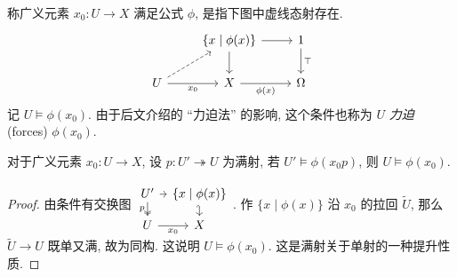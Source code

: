 \newcommand{\forces}{\models}

\begin{definition}
	{}
	称广义元素 $x_0 \colon U\to X$ 满足公式 $\phi$, 是指下图中虚线态射存在.
	\[\begin{tikzcd}[ampersand replacement=\&]
		\& {\{x\mid\phi(x)\}} \& 1 \\
		U \& X \& \Omega
		\arrow[from=1-2, to=2-2]
		\arrow["{x_0}"', from=2-1, to=2-2]
		\arrow["{\phi(x)}"', from=2-2, to=2-3]
		\arrow[dashed, from=2-1, to=1-2]
		\arrow[from=1-2, to=1-3]
		\arrow["\top", from=1-3, to=2-3]
	\end{tikzcd}\]
	记 $U\forces \phi(x_0)$. 由于后文介绍的 ``力迫法'' 的影响, 这个条件也称为 $U$ \emph{力迫} (forces) $\phi(x_0)$.
\end{definition}

\begin{prop}
	[label={epi-forcing}]
	{}
	对于广义元素 $x_0 \colon U\to X$, 设 $p\colon U' \twoheadrightarrow U$ 为满射, 若 $U'\forces\phi(x_0 p)$, 则 $U\forces \phi(x_0)$.
\end{prop}
\begin{proof}
	由条件有交换图
	$\begin{tikzcd}[ampersand replacement=\&,row sep=small,column sep=tiny]
		{U'} \& {\{x\mid\phi(x)\}} \\
		U \& X
		\arrow["p"', two heads, from=1-1, to=2-1]
		\arrow[from=1-1, to=1-2]
		\arrow[hook', from=1-2, to=2-2]
		\arrow["x_0"', from=2-1, to=2-2]
	\end{tikzcd}$.
	作 $\{x\mid\phi(x)\}$ 沿 $x_0$ 的拉回 $\widetilde {U}$,
	那么 $\widetilde U \to U$ 既单又满, 故为同构.
	这说明 $U\forces \phi(x_0)$.
	这是满射关于单射的一种提升性质.
\end{proof}

